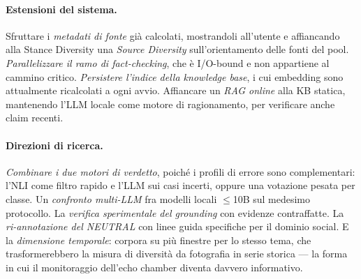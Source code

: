 \documentclass[11pt,a4paper]{report}
\begin{document}
\paragraph{Estensioni del sistema.} Sfruttare i \emph{metadati di fonte} già calcolati, mostrandoli
all'utente e affiancando alla Stance Diversity una \emph{Source Diversity} sull'orientamento delle
fonti del pool. \emph{Parallelizzare il ramo di fact-checking}, che è I/O-bound e non appartiene al
cammino critico. \emph{Persistere l'indice della knowledge base}, i cui embedding sono attualmente
ricalcolati a ogni avvio. Affiancare un \emph{RAG online} alla KB statica, mantenendo l'LLM locale
come motore di ragionamento, per verificare anche claim recenti.

\paragraph{Direzioni di ricerca.} \emph{Combinare i due motori di verdetto}, poiché i profili di
errore sono complementari: l'NLI come filtro rapido e l'LLM sui casi incerti, oppure una votazione
pesata per classe. Un \emph{confronto multi-LLM} fra modelli locali $\le$10B sul medesimo
protocollo. La \emph{verifica sperimentale del grounding} con evidenze contraffatte. La
\emph{ri-annotazione del NEUTRAL} con linee guida specifiche per il dominio social. E la
\emph{dimensione temporale}: corpora su più finestre per lo stesso tema, che trasformerebbero la
misura di diversità da fotografia in serie storica --- la forma in cui il monitoraggio dell'echo
chamber diventa davvero informativo.

\appendix
\end{document}
